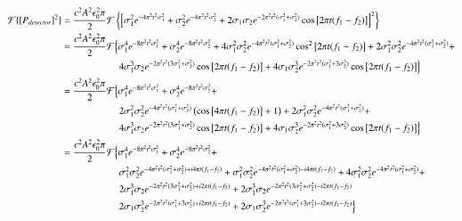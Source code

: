 \begin{align}
\mathcal{F}\{\left[P_{detector}\right]^2\} &= \frac{c^2A^2\epsilon_0^2 \pi}{2}\mathcal{F}\left\{\left[\sigma_1^2 e^{-4\pi^2t^2\sigma_1^2} + \sigma_2^2 e^{-4\pi^2t^2\sigma_2^2} + 2\sigma_1\sigma_2 e^{-2\pi^2t^2(\sigma_1^2+\sigma_2^2)}\cos\big[2\pi t (f_1-f_2)\big] \right]^2\right\}\notag\\
&= \frac{c^2A^2\epsilon_0^2 \pi}{2}\mathcal{F}\Big\{\sigma_1^4 e^{-8\pi^2t^2\sigma_1^2} + \sigma_2^4 e^{-8\pi^2t^2\sigma_2^2} + 4\sigma_1^2\sigma_2^2 e^{-4\pi^2t^2(\sigma_1^2+\sigma_2^2)}\cos^2\big[2\pi t (f_1-f_2)\big] + 2\sigma_1^2\sigma_2^2 e^{-4\pi^2t^2(\sigma_1^2+\sigma_2^2)} +\notag\\
&\quad\quad\quad\quad\quad\quad  4\sigma_1^3\sigma_2 e^{-2\pi^2t^2(3\sigma_1^2+\sigma_2^2)}\cos\big[2\pi t (f_1-f_2)\big] + 4\sigma_1\sigma_2^3e^{-2\pi^2t^2(\sigma_1^2+3\sigma_2^2)}\cos\big[2\pi t (f_1-f_2)\big] \Big\}\notag\\
&= \frac{c^2A^2\epsilon_0^2 \pi}{2}\mathcal{F}\Big\{\sigma_1^4 e^{-8\pi^2t^2\sigma_1^2} + \sigma_2^4 e^{-8\pi^2t^2\sigma_2^2} + \notag\\
&\quad\quad\quad\quad\quad\quad2\sigma_1^2\sigma_2^2 e^{-4\pi^2t^2(\sigma_1^2+\sigma_2^2)}\left(\cos\big[4\pi t (f_1-f_2)\big]+1\right)  + 2\sigma_1^2\sigma_2^2 e^{-4\pi^2t^2(\sigma_1^2+\sigma_2^2)} +\notag\\
&\quad\quad\quad\quad\quad\quad  4\sigma_1^3\sigma_2 e^{-2\pi^2t^2(3\sigma_1^2+\sigma_2^2)}\cos\big[2\pi t (f_1-f_2)\big] + 4\sigma_1\sigma_2^3e^{-2\pi^2t^2(\sigma_1^2+3\sigma_2^2)}\cos\big[2\pi t (f_1-f_2)\big] \Big\}\notag\\
&= \frac{c^2A^2\epsilon_0^2 \pi}{2}\mathcal{F}\Big\{\sigma_1^4 e^{-8\pi^2t^2\sigma_1^2} + \sigma_2^4 e^{-8\pi^2t^2\sigma_2^2} + \notag\\
&\quad\quad\quad\quad\quad\quad\sigma_1^2\sigma_2^2 e^{-4\pi^2t^2(\sigma_1^2+\sigma_2^2)+i4\pi t (f_1-f_2)} + \sigma_1^2\sigma_2^2 e^{-4\pi^2t^2(\sigma_1^2+\sigma_2^2)-i4\pi t (f_1-f_2)} + 4\sigma_1^2\sigma_2^2 e^{-4\pi^2t^2(\sigma_1^2+\sigma_2^2)} +\notag\\
&\quad\quad\quad\quad\quad\quad  2\sigma_1^3\sigma_2 e^{-2\pi^2t^2(3\sigma_1^2+\sigma_2^2)+i2\pi t (f_1-f_2)} + 2\sigma_1^3\sigma_2 e^{-2\pi^2t^2(3\sigma_1^2+\sigma_2^2)-i2\pi t (f_1-f_2)}\notag\\
&\quad\quad\quad\quad\quad\quad 2\sigma_1\sigma_2^3e^{-2\pi^2t^2(\sigma_1^2+3\sigma_2^2)+i2\pi t (f_1-f_2)} + 2\sigma_1\sigma_2^3e^{-2\pi^2t^2(\sigma_1^2+3\sigma_2^2)-i2\pi t (f_1-f_2)}\Big\}\notag\\

\end{align}
